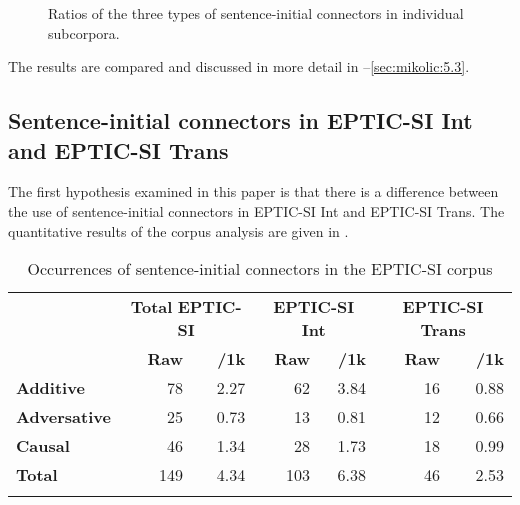 \documentclass[output=paper]{langscibook}
\begin{document}
\begin{figure}
{
        }
\caption{Ratios of the three types of sentence-initial connectors in individual subcorpora.}
\label{fig:mikolic:2}
\end{figure}

The results are compared and discussed in more detail in --\ref{sec:mikolic:5.3}.

\subsection{
Sentence-initial connectors in EPTIC-SI Int and EPTIC-SI Trans
}\label{sec:mikolic:5.1}

The first hypothesis examined in this paper is that there is a difference between the use of sentence-initial connectors in EPTIC-SI Int and EPTIC-SI Trans. The quantitative results of the corpus analysis are given in .


\begin{table}
\begin{tabularx}{\textwidth}{Xrrrrrr}
\lsptoprule
& \multicolumn{2}{c}{{\bfseries Total}
{\bfseries EPTIC-SI}} & \multicolumn{2}{c}{{\bfseries EPTIC-SI Int}} & \multicolumn{2}{c}{{\bfseries EPTIC-SI Trans}}\\
& {\bfseries Raw} & {\bfseries /1k} & {\bfseries Raw} & {\bfseries /1k} & {\bfseries Raw} & {\bfseries /1k}\\
\midrule
{\bfseries Additive} & 78 & 2.27 & 62 & 3.84 & 16 & 0.88\\
{\bfseries Adversative} & 25 & 0.73 & 13 & 0.81 & 12 & 0.66\\
{\bfseries Causal} & 46 & 1.34 & 28 & 1.73 & 18 & 0.99\\
\midrule
{\bfseries Total} & 149 & 4.34 & 103 & 6.38 & 46 & 2.53\\
\lspbottomrule
\end{tabularx}
\caption{Occurrences of sentence-initial connectors in the EPTIC-SI corpus}
\label{tab:mikolic:4}
\end{table}
\end{document}
